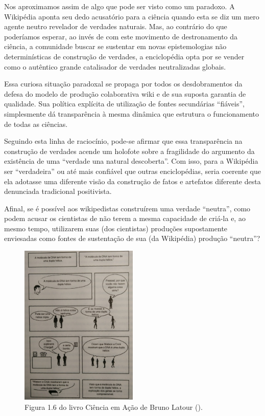 Nos aproximamos assim de algo que pode ser visto como um paradoxo. A Wikipédia aponta seu dedo acusatório para a ciência quando esta se diz um mero agente neutro revelador de verdades naturais. Mas, ao contrário do que poderíamos esperar, ao invés de com este movimento de destronamento da ciência, a comunidade buscar se sustentar em novas epistemologias não determinísticas de construção de verdades, a enciclopédia opta por se vender como o autêntico grande catalisador de verdades neutralizadas globais.

Essa curiosa situação paradoxal se propaga por todos os desdobramentos da defesa do modelo de produção colaborativa wiki e de sua suposta garantia de qualidade. Sua política explícita de utilização de fontes secundárias ``fiáveis'', simplesmente dá transparência à mesma dinâmica que estrutura o funcionamento de todas as ciências.

Seguindo esta linha de raciocínio, pode-se afirmar que essa transparência na construção de verdades acende um holofote sobre a fragilidade do argumento da existência de uma ``verdade una natural descoberta''. Com isso, para a Wikipédia ser ``verdadeira'' ou até mais confiável que outras enciclopédias, seria coerente que ela adotasse uma diferente visão da construção de fatos e artefatos diferente desta denunciada tradicional positivista.

Afinal, se é possível aos wikipedistas construírem uma verdade ``neutra'', como podem acusar os cientistas de não terem a mesma capacidade de criá-la e, ao mesmo tempo, utilizarem suas (dos cientistas) produções supostamente enviesadas como fontes de sustentação de sua (da Wikipédia) produção ``neutra''? 

\begin{figure}[H]
    \centering
    \includegraphics[width=0.5\textwidth]{Images/livro_ciencia_em_acao.png}
    \caption{Figura 1.6 do livro Ciência em Ação de Bruno Latour (\citeyear[p. 22]{latour_ciencia_1987}).}
    \label{fig:livro_ciencia_em_acao}
\end{figure}

